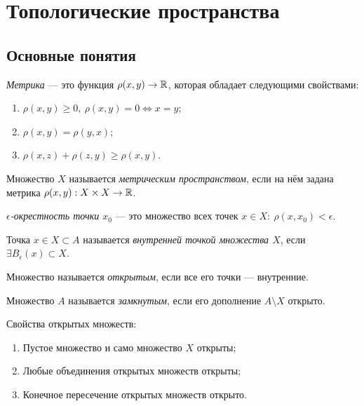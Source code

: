 \section{Топологические пространства}
\subsection{Основные понятия}
\begin{definition}
    \textit{Метрика} — это функция $\rho(x,y) \to \mathbb{R}$, которая обладает следующими свойствами:
    \begin{enumerate}
        \item $\rho(x,y) \geq 0, \ \rho(x,y) = 0 \Leftrightarrow x = y$;
        \item $\rho(x,y) = \rho(y,x)$;
        \item $\rho(x,z) + \rho(z,y) \geq \rho(x,y)$.
    \end{enumerate}
\end{definition}

\begin{definition}
    Множество $X$ называется \textit{метрическим пространством}, если на нём задана метрика $\rho(x,y): X \times X \to \mathbb{R}$.
\end{definition}

\begin{definition}
    \textit{$\epsilon$-окрестность точки $x_0$} — это множество всех точек $x \in X: \ \rho(x, x_0) < \epsilon$.
\end{definition}

\begin{definition}
    Точка $x \in X \subset A$ называется \textit{внутренней точкой множества $X$}, если $\exists B_{\epsilon} (x) \subset X$.
\end{definition}

\begin{definition}
    Множество называется \textit{открытым}, если все его точки — внутренние.
\end{definition}

\begin{definition}
    Множество $A$ называется \textit{замкнутым}, если его дополнение $A \setminus X$ открыто.
\end{definition}

Свойства открытых множеств:
\begin{enumerate}
    \item Пустое множество и само множество $X$ открыты;
    \item Любые объединения открытых множеств открыты;
    \item Конечное пересечение открытых множеств открыто.
\end{enumerate}

